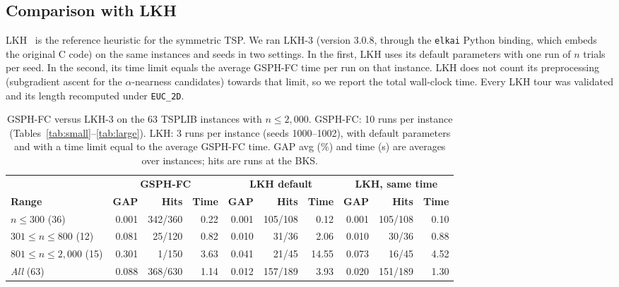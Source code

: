 \documentclass[runningheads]{llncs}
\begin{document}
\subsection{Comparison with LKH}
\label{sec:lkh}

LKH~\cite{helsgaun2000effective,helsgaun2017extension} is the reference
heuristic for the symmetric TSP. We ran LKH-3 (version 3.0.8, through the
\texttt{elkai} Python binding, which embeds the original C code) on the
same instances and seeds in two settings. In the first, LKH uses its
default parameters with one run of $n$ trials per seed. In the second,
its time limit equals the average GSPH-FC time per run on that instance.
LKH does not count its preprocessing (subgradient ascent for the
$\alpha$-nearness candidates) towards that limit, so we report the total
wall-clock time. Every LKH tour was validated and its length recomputed
under \texttt{EUC\_2D}.

\begin{table}
\caption{GSPH-FC versus LKH-3 on the 63 TSPLIB instances with
$n\le 2{,}000$. GSPH-FC: 10 runs per instance
(Tables~\ref{tab:small}--\ref{tab:large}). LKH: 3 runs per instance
(seeds 1000--1002), with default parameters and with a time limit equal
to the average GSPH-FC time. GAP avg (\%) and time (s) are averages over
instances; hits are runs at the BKS.}
\label{tab:lkh}
\centering\scriptsize
\begin{tabular}{@{}lrrrrrrrrr@{}}
\toprule
& \multicolumn{3}{c}{\textbf{GSPH-FC}} & \multicolumn{3}{c}{\textbf{LKH default}} & \multicolumn{3}{c}{\textbf{LKH, same time}}\\
\cmidrule(lr){2-4}\cmidrule(lr){5-7}\cmidrule(lr){8-10}
\textbf{Range} & \textbf{GAP} & \textbf{Hits} & \textbf{Time} & \textbf{GAP} & \textbf{Hits} & \textbf{Time} & \textbf{GAP} & \textbf{Hits} & \textbf{Time}\\
\midrule
$n\le 300$ (36)           & 0.001 & 342/360 & 0.22 & 0.001 & 105/108 &  0.12 & 0.001 & 105/108 & 0.10 \\
$301\le n\le 800$ (12)    & 0.081 &  25/120 & 0.82 & 0.010 &  31/36  &  2.06 & 0.010 &  30/36  & 0.88 \\
$801\le n\le 2{,}000$ (15)& 0.301 &   1/150 & 3.63 & 0.041 &  21/45  & 14.55 & 0.073 &  16/45  & 4.52 \\
\midrule
\textit{All} (63)         & 0.088 & 368/630 & 1.14 & 0.012 & 157/189 &  3.93 & 0.020 & 151/189 & 1.30 \\
\bottomrule
\end{tabular}
\end{table}
\end{document}
